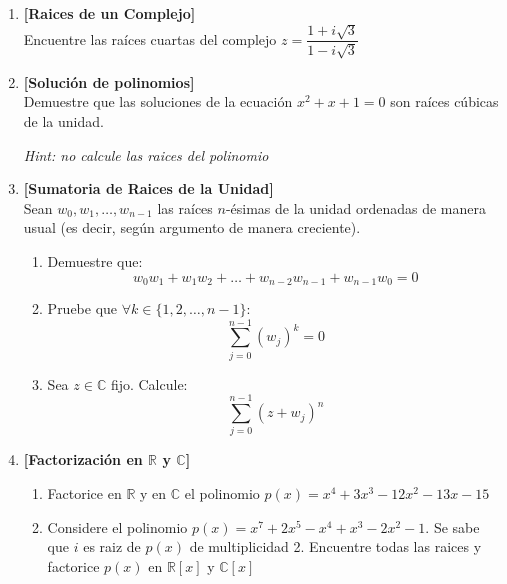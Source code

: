 \documentclass[letterpaper,10pt]{article}
\newcommand{\R}{\mathbb R}
\newcommand{\C}{\mathbb C}
\theoremstyle{plain}
\begin{document}
\begin{enumerate}[\bf P1.]
    \item \textbf{[Raices de un Complejo]}\\Encuentre las raíces cuartas del complejo $z=\dfrac{1+i\sqrt{3}}{1-i\sqrt{3}}$
    
	\item \textbf{[Solución de polinomios]}\\Demuestre que las soluciones de la ecuación $x^2 + x + 1 = 0$ son raíces cúbicas de la unidad.
	
	\textit{Hint: no calcule las raices del polinomio}
	
	\item \textbf{[Sumatoria de Raices de la Unidad]}\\ Sean $w_0,w_1, \dotso, w_{n-1}$ las raíces $n$-ésimas de la unidad ordenadas de manera usual (es decir, según argumento de manera creciente).
        \begin{enumerate}
        	\item Demuestre que:
        	$$
        	w_0 w_1 + w_1w_2 + \dotso + w_{n-2}w_{n-1} + w_{n-1}w_0=0
        	$$
        	\item Pruebe que $\forall k \in \{1,2, \dotso , n-1  \}$:
        	$$
        	\sum_{j=0}^{n-1} (w_j)^k=0
        	$$
        	\item Sea $z \in \C$ fijo. Calcule:
        	$$
        	\sum_{j=0}^{n-1} (z+w_j)^n
        	$$
        \end{enumerate}
    
    \item \textbf{[Factorización en $\R$ y $\C$]}
    \begin{enumerate} 
        \item Factorice en $\R$ y en $\C$ el polinomio $p(x)=x^4+3x^3-12x^2-13x-15$
        \item Considere el polinomio $p(x)=x^7+2x^5-x^4+x^3-2x^2-1$. Se sabe que $i$ es raiz de $p(x)$ de multiplicidad 2. Encuentre todas las raices y factorice $p(x)$ en $\R[x]$ y $\C[x]$ 
    \end{enumerate}
    

\end{enumerate}
\end{document}
